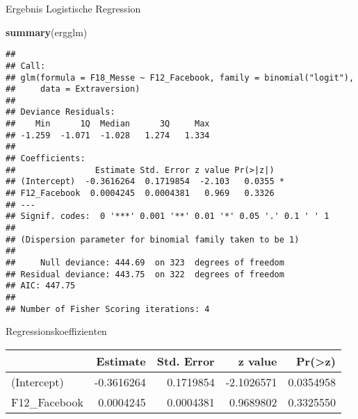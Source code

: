 \documentclass[ignorenonframetext,]{beamer}
\newenvironment{Shaded}{\begin{snugshade}}{\end{snugshade}}
\newcommand{\KeywordTok}[1]{\textcolor[rgb]{0.13,0.29,0.53}{\textbf{{#1}}}}
\newcommand{\NormalTok}[1]{{#1}}
\begin{document}
\begin{frame}[fragile]{Ergebnis Logistische Regression}

\begin{Shaded}
\begin{Highlighting}[]
\KeywordTok{summary}\NormalTok{(ergglm)}
\end{Highlighting}
\end{Shaded}

\begin{verbatim}
## 
## Call:
## glm(formula = F18_Messe ~ F12_Facebook, family = binomial("logit"), 
##     data = Extraversion)
## 
## Deviance Residuals: 
##    Min      1Q  Median      3Q     Max  
## -1.259  -1.071  -1.028   1.274   1.334  
## 
## Coefficients:
##                Estimate Std. Error z value Pr(>|z|)  
## (Intercept)  -0.3616264  0.1719854  -2.103   0.0355 *
## F12_Facebook  0.0004245  0.0004381   0.969   0.3326  
## ---
## Signif. codes:  0 '***' 0.001 '**' 0.01 '*' 0.05 '.' 0.1 ' ' 1
## 
## (Dispersion parameter for binomial family taken to be 1)
## 
##     Null deviance: 444.69  on 323  degrees of freedom
## Residual deviance: 443.75  on 322  degrees of freedom
## AIC: 447.75
## 
## Number of Fisher Scoring iterations: 4
\end{verbatim}

\end{frame}

\begin{frame}{Regressionskoeffizienten}

\begin{longtable}[]{@{}lrrrr@{}}
\toprule
\begin{minipage}[b]{0.19\columnwidth}\raggedright\strut
\strut
\end{minipage} & \begin{minipage}[b]{0.19\columnwidth}\raggedleft\strut
Estimate\strut
\end{minipage} & \begin{minipage}[b]{0.19\columnwidth}\raggedleft\strut
Std. Error\strut
\end{minipage} & \begin{minipage}[b]{0.19\columnwidth}\raggedleft\strut
z value\strut
\end{minipage} & \begin{minipage}[b]{0.19\columnwidth}\raggedleft\strut
Pr(\textgreater{}\textbar{}z\textbar{})\strut
\end{minipage}\tabularnewline
\midrule
\endhead
(Intercept) & -0.3616264 & 0.1719854 & -2.1026571 &
0.0354958\tabularnewline
F12\_Facebook & 0.0004245 & 0.0004381 & 0.9689802 &
0.3325550\tabularnewline
\bottomrule
\end{longtable}

\end{frame}
\end{document}

